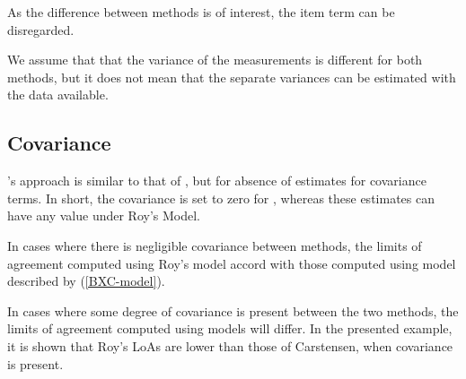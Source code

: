 \documentclass[12pt, a4paper]{report}
\theoremstyle{plain}
\theoremstyle{definition}
\theoremstyle{remark}
\begin{document}
As the difference between methods is of interest, the item term can be disregarded.

We assume that that the variance of the measurements is different for both methods, but it does not mean that the separate variances can be estimated with the data available.\\
















\subsection{Covariance}
\citet{BXC2008}'s approach is similar to that of \citet{ARoy2009}, but for absence of estimates for covariance terms. In short, the covariance is set to zero for \citet{BXC2008}, whereas these estimates can have any value under Roy's Model. 

In cases where there is negligible covariance between methods, the limits of agreement computed using Roy's model accord with those computed using model described by (\ref{BXC-model}). 

In cases where some degree of covariance is present between the two methods, the limits of agreement computed using models will differ. In the presented
example, it is shown that Roy's LoAs are lower than those of Carstensen, when covariance is present.
\end{document}
